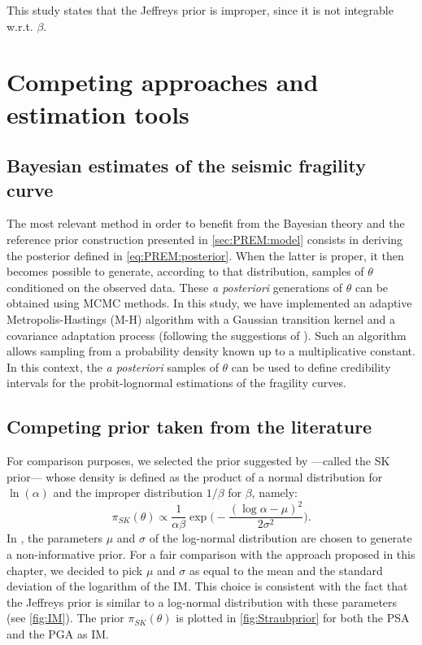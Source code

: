 This study states that the Jeffreys prior is improper, since it is not integrable w.r.t. $\beta$.


\section{Competing approaches and estimation tools}\label{sec:PREM:competing}



    \subsection{Bayesian estimates of the seismic fragility curve}


    The most relevant method in order to benefit from the Bayesian theory and the reference prior construction presented in \cref{sec:PREM:model} consists in deriving the posterior defined in \cref{eq:PREM:posterior}.
    When the latter is proper, it then becomes possible to generate, according to that distribution, samples of $\theta$ conditioned on the observed data. These \emph{a posteriori} generations of $\theta$ can be obtained using MCMC methods. In this study, we have implemented an adaptive Metropolis-Hastings (M-H) algorithm with a Gaussian transition kernel and a covariance adaptation process (following the suggestions of \cite{haario_adaptive_2001}). Such an algorithm allows sampling from a probability density known up to a multiplicative constant. In this context, the \emph{a posteriori} samples of $\theta$ can be used to define credibility intervals for the probit-lognormal estimations of the fragility curves.



    \subsection{Competing prior taken from the literature}

    {For comparison purposes, we selected the prior} suggested by \citet{straub_improved_2008} ---called the SK prior--- whose density is defined as the product of a normal distribution for $\ln(\alpha)$ and the improper distribution $1/\beta$ for $\beta$, namely:
    \begin{equation}\label{eq:Straubprior}
        \pi_{SK}(\theta)\propto\frac{1}{\alpha\beta} \exp\Big( -\frac{(\log\alpha-\mu)^2}{2\sigma^2}\Big).
    \end{equation}
In \cite{straub_improved_2008}, the parameters $\mu$ and $\sigma$ of the log-normal distribution are chosen to generate a non-informative prior. 
For a fair comparison with the approach proposed in this chapter, we decided to pick $\mu$ and $\sigma$ as equal to the mean and the standard deviation of the logarithm of the IM. This choice is consistent with the fact that the Jeffreys prior is similar to a log-normal distribution with these parameters (see \cref{fig:IM}). The prior $\pi_{SK}(\theta)$ is plotted in \cref{fig:Straubprior} for both the PSA and the PGA as IM.

